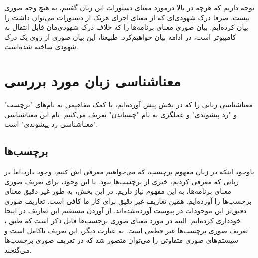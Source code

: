 توجه داریم که هر‌چه در بالا در‌مورد معنای دستورات این زبان گفتیم، به هیچ وجه صوری نیست. صرفا درک شهودی‌ای که از معنای اجرای هر‌یک از دستورات می‌توان داشت را بیان کرده‌ایم. بیان صوری معنای برنامه‌ها را که خلاف درک شهودی‌مان قابل انتقال به کامپیوتر‌ است، در ادامه بیان خواهیم‌کرد. طبیعتا، این بیان صوری از روی یک درک شهودی ساخته شده‌است.

\section{معناشناسی زبان مورد بررسی‬}
معناشناسی زبانی را که در بخش پیش آورده‌ایم، با کمک مفاهیمی به نام‌های "برچسب" و "رد پیشوندی" و عملگری به نام "چسباندن" تعریف می‌کنیم. نام این معناشناسی "معناشناسی رد پیشوندی" است.\\

\subsection{برچسب‌ها}

با‌وجود اینکه در زبان  مفهوم برچسب، که می‌خواهیم معرفی اش کنیم، وجود دارد،اما در زبانی که معرفی کردیم، خبری از برچسب‌ها نبود. با این وجود، برای تعریف صوری معنای برنامه‌ها، به این مفهوم نیاز داریم. در این بخش، به ‌طور غیر دقیق معنای برچسب‌ها را آورده‌ایم. همین تعاریف غیر دقیق برای کار ما کافی است. تعاریف صوری دقیق‌تر این موجودات در پیوست \cite{calcul} آورده‌شده‌اند. از آوردن مستقیم این تعاریف در اینجا خود‌داری کرده‌ایم. البته در مورد معنای صوری برجسب‌ها قابل ذکر است که طبق \cite{cousotbook}، تعریف صوری برچسب‌ها غیر قطعی است. به عبارت دیگر، این تعریف ناکامل است و سیستم‌های صوری متفاوتی را می‌توان متصور شد که در تعریف صوری برچسب‌ها می‌گنجند.

